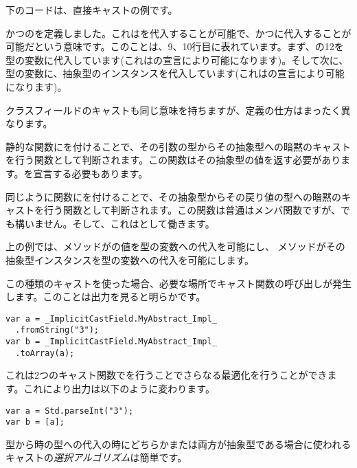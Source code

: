下のコードは、直接キャストの例です。


かつのを定義しました。これはを代入することが可能で、かつに代入することが可能だという意味です。このことは、9、10行目に表れています。まず、の12を型の変数に代入しています(これはの宣言により可能になります)。そして次に、型の変数に、抽象型のインスタンスを代入しています(これはの宣言により可能になります)。

クラスフィールドのキャストも同じ意味を持ちますが、定義の仕方はまったく異なります。


静的な関数にを付けることで、その引数の型からその抽象型への暗黙のキャストを行う関数として判断されます。この関数はその抽象型の値を返す必要があります。を宣言する必要もあります。

同じように関数にを付けることで、その抽象型からその戻り値の型への暗黙のキャストを行う関数として判断されます。この関数は普通はメンバ関数ですが、でも構いません。そして、これはとして働きます。

上の例では、メソッドがの値を型の変数への代入を可能にし、
メソッドがその抽象型インスタンスを型の変数への代入を可能にします。

この種類のキャストを使った場合、必要な場所でキャスト関数の呼び出しが発生します。このことは出力を見ると明らかです。

\begin{lstlisting}
var a = _ImplicitCastField.MyAbstract_Impl_
  .fromString("3");
var b = _ImplicitCastField.MyAbstract_Impl_
  .toArray(a);
\end{lstlisting}

これは2つのキャスト関数でを行うことでさらなる最適化を行うことができます。これにより出力は以下のように変わります。

\begin{lstlisting}
var a = Std.parseInt("3");
var b = [a];
\end{lstlisting}


型から時の型への代入の時にどちらかまたは両方が抽象型である場合に使われるキャストの\emph{選択アルゴリズム}は簡単です。

